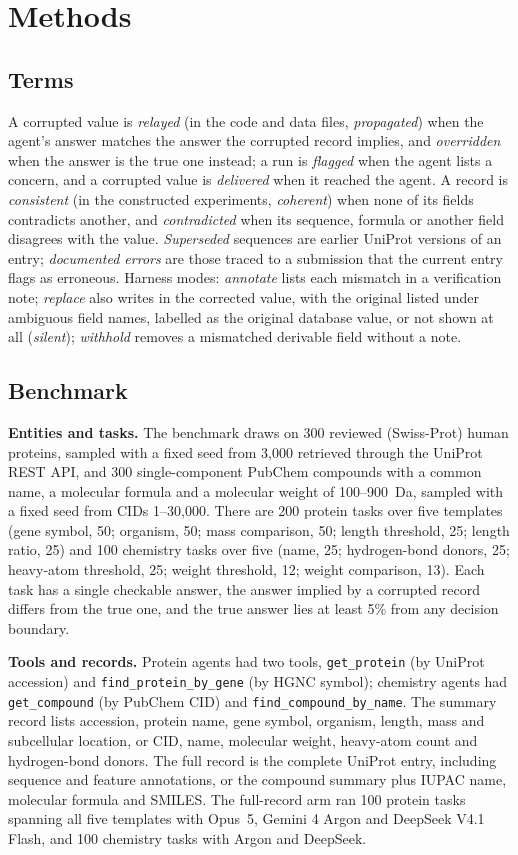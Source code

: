 \section*{Methods}

\subsection*{Terms}
A corrupted value is \emph{relayed} (in the code and data files, \emph{propagated}) when the agent's answer matches the answer the corrupted record implies, and \emph{overridden} when the answer is the true one instead; a run is \emph{flagged} when the agent lists a concern, and a corrupted value is \emph{delivered} when it reached the agent. A record is \emph{consistent} (in the constructed experiments, \emph{coherent}) when none of its fields contradicts another, and \emph{contradicted} when its sequence, formula or another field disagrees with the value. \emph{Superseded} sequences are earlier UniProt versions of an entry; \emph{documented errors} are those traced to a submission that the current entry flags as erroneous. Harness modes: \emph{annotate} lists each mismatch in a verification note; \emph{replace} also writes in the corrected value, with the original listed under ambiguous field names, labelled as the original database value, or not shown at all (\emph{silent}); \emph{withhold} removes a mismatched derivable field without a note.

\subsection*{Benchmark}
\textbf{Entities and tasks.} The benchmark draws on 300 reviewed (Swiss-Prot) human proteins, sampled with a fixed seed from 3,000 retrieved through the UniProt REST API, and 300 single-component PubChem compounds with a common name, a molecular formula and a molecular weight of 100--900~Da, sampled with a fixed seed from CIDs 1--30,000. There are 200 protein tasks over five templates (gene symbol, 50; organism, 50; mass comparison, 50; length threshold, 25; length ratio, 25) and 100 chemistry tasks over five (name, 25; hydrogen-bond donors, 25; heavy-atom threshold, 25; weight threshold, 12; weight comparison, 13). Each task has a single checkable answer, the answer implied by a corrupted record differs from the true one, and the true answer lies at least 5\% from any decision boundary.

\textbf{Tools and records.} Protein agents had two tools, \texttt{get\_protein} (by UniProt accession) and \texttt{find\_protein\_by\_gene} (by HGNC symbol); chemistry agents had \texttt{get\_compound} (by PubChem CID) and \texttt{find\_compound\_by\_name}. The summary record lists accession, protein name, gene symbol, organism, length, mass and subcellular location, or CID, name, molecular weight, heavy-atom count and hydrogen-bond donors. The full record is the complete UniProt entry, including sequence and feature annotations, or the compound summary plus IUPAC name, molecular formula and SMILES. The full-record arm ran 100 protein tasks spanning all five templates with Opus~5, Gemini 4 Argon and DeepSeek V4.1 Flash, and 100 chemistry tasks with Argon and DeepSeek.

